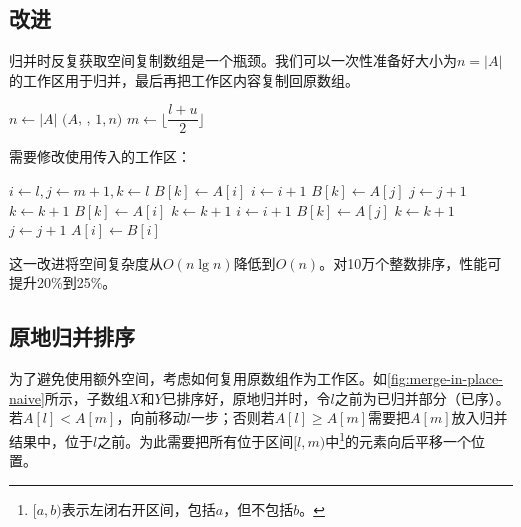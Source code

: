 \documentclass[b5paper]{ctexart}
\begin{document}
\subsection{改进}

归并时反复获取空间复制数组是一个瓶颈\cite{Bentley}。我们可以一次性准备好大小为$n = |A|$的工作区用于归并，最后再把工作区内容复制回原数组。

\begin{algorithmic}[1]
  \State $n \gets |A|$
  \State {}$(A$, , $1, n)$
\EndProcedure
\Statex
{}
    \State $m \gets \lfloor \dfrac{l + u}{2} \rfloor$
    \State {}
    \State {}
    \State {}
  \EndIf
\EndProcedure
\end{algorithmic}

需要修改使用传入的工作区：

\begin{algorithmic}[1]
  \State $i \gets l, j \gets m + 1, k \gets l$
      \State $B[k] \gets A[i]$
      \State $i \gets i + 1$
    \Else
      \State $B[k] \gets A[j]$
      \State $j \gets j + 1$
    \EndIf
    \State $k \gets k + 1$
  \EndWhile
    \State $B[k] \gets A[i]$
    \State $k \gets k + 1$
    \State $i \gets i + 1$
  \EndWhile
    \State $B[k] \gets A[j]$
    \State $k \gets k + 1$
    \State $j \gets j + 1$
  \EndWhile
   
    \State $A[i] \gets B[i]$
  \EndFor
\EndProcedure
\end{algorithmic}

这一改进将空间复杂度从$O(n \lg n)$降低到$O(n)$。对10万个整数排序，性能可提升20\%到25\%。

\subsection{原地归并排序}

为了避免使用额外空间，考虑如何复用原数组作为工作区。如\cref{fig:merge-in-place-naive}所示，子数组$X$和$Y$已排序好，原地归并时，令$l$之前为已归并部分（已序）。若$A[l] < A[m]$，向前移动$l$一步；否则若$A[l] \geq A[m]$需要把$A[m]$放入归并结果中，位于$l$之前。为此需要把所有位于区间$[l, m)$中\footnote{$[a, b)$表示左闭右开区间，包括$a$，但不包括$b$。}的元素向后平移一个位置。
\end{document}

